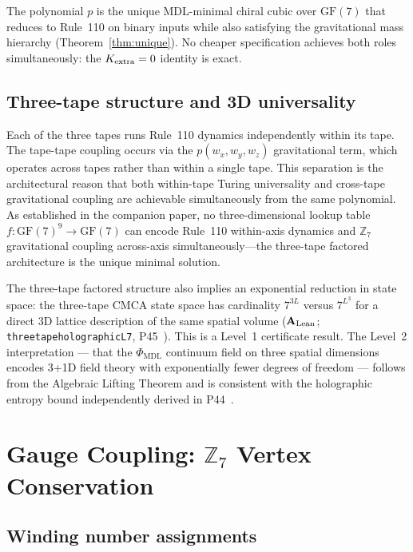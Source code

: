 \documentclass[11pt]{article}
\theoremstyle{remark}
\newcommand{\PHIMDL}{\Phi_{\mathrm{MDL}}}
\newcommand{\ZS}{\mathbb{Z}_7}
\newcommand{\lean}[1]{%
  \penalty-100
  \begingroup\def\_{\textunderscore\allowbreak}\texttt{#1}\endgroup}
\newcommand{\GFseven}{\mathrm{GF}(7)}
\newcommand{\CatAL}{\ensuremath{\textbf{A}_{\rm Lean}}}
\begin{document}
The polynomial $p$ is the unique MDL-minimal chiral cubic over $\GFseven$ that
reduces to Rule~110 on binary inputs while also satisfying the gravitational
mass hierarchy (Theorem~\ref{thm:unique}). No cheaper specification achieves
both roles simultaneously: the $K_{\rm extra} = 0$ identity is exact.

\subsection{Three-tape structure and 3D universality}
\label{ssec:3d_universal}

Each of the three tapes runs Rule~110 dynamics independently within its tape.
The tape-tape coupling occurs via the $p(w_x, w_y, w_z)$ gravitational term,
which operates across tapes rather than within a single tape. This separation
is the architectural reason that both within-tape Turing universality and
cross-tape gravitational coupling are achievable simultaneously from the same
polynomial. As established in the companion paper, no three-dimensional lookup
table $f:\GFseven^9\to\GFseven$ can encode Rule~110 within-axis dynamics and
$\ZS$ gravitational coupling across-axis simultaneously---the three-tape
factored architecture is the unique minimal solution.

The three-tape factored structure also implies an exponential reduction in state space:
the three-tape CMCA state space has cardinality $7^{3L}$ versus $7^{L^3}$ for a
direct 3D lattice description of the same spatial volume ($\CatAL$;
\lean{three\_tape\_holographic\_L7}, P45~\cite{SpivackThreeTapeCMCA}).  This is a
Level~1 certificate result.  The Level~2 interpretation --- that the $\PHIMDL$
continuum field on three spatial dimensions encodes 3+1D field theory with exponentially
fewer degrees of freedom --- follows from the Algebraic Lifting Theorem and is
consistent with the holographic entropy bound independently derived in
P44~\cite{SpivackQGR}.

\section{Gauge Coupling: $\mathbb{Z}_7$ Vertex Conservation}
\label{sec:gauge}

\subsection{Winding number assignments}
\label{ssec:winding}
\end{document}
